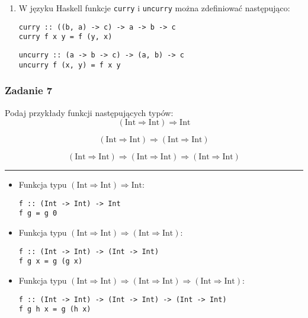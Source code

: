 \documentclass[11pt,a4paper]{article}
\begin{document}
\begin{enumerate}
\begin{itemize}
\begin{equation}
                \end{equation}
        \end{itemize}
        A więc istnieje biekcja między \( (C^B)^A \) i \( C^{B \times A} \), co oznacza, że te zbiory mają taką samą moc. \qed
    \item W języku Haskell funkcje \texttt{curry} i \texttt{uncurry} można zdefiniować następująco:
        \begin{Verbatim}[frame=single]
curry :: ((b, a) -> c) -> a -> b -> c
curry f x y = f (y, x)
        \end{Verbatim}
        \begin{Verbatim}[frame=single]
uncurry :: (a -> b -> c) -> (a, b) -> c
uncurry f (x, y) = f x y
        \end{Verbatim}

\end{enumerate}

\subsubsection{Zadanie 7}
Podaj przykłady funkcji następujących typów:
\[
(\text{Int} \Rightarrow \text{Int}) \Rightarrow \text{Int}
\]

\[
(\text{Int} \Rightarrow \text{Int}) \Rightarrow (\text{Int} \Rightarrow \text{Int})
\]

\[
(\text{Int} \Rightarrow \text{Int}) \Rightarrow (\text{Int} \Rightarrow \text{Int}) \Rightarrow (\text{Int} \Rightarrow \text{Int})
\]

\bigskip
\hrule
\bigskip

\begin{itemize}
    \item Funkcja typu \( (\text{Int} \Rightarrow \text{Int}) \Rightarrow \text{Int} \):
        \begin{Verbatim}[frame=single]
f :: (Int -> Int) -> Int
f g = g 0
        \end{Verbatim}
    \item Funkcja typu \( (\text{Int} \Rightarrow \text{Int}) \Rightarrow (\text{Int} \Rightarrow \text{Int}) \):
        \begin{Verbatim}[frame=single]
f :: (Int -> Int) -> (Int -> Int)
f g x = g (g x)
        \end{Verbatim}
    \item Funkcja typu \( (\text{Int} \Rightarrow \text{Int}) \Rightarrow (\text{Int} \Rightarrow \text{Int}) \Rightarrow (\text{Int} \Rightarrow \text{Int}) \):
        \begin{Verbatim}[frame=single]
f :: (Int -> Int) -> (Int -> Int) -> (Int -> Int)
f g h x = g (h x)
        \end{Verbatim}
\end{itemize}
\end{document}
